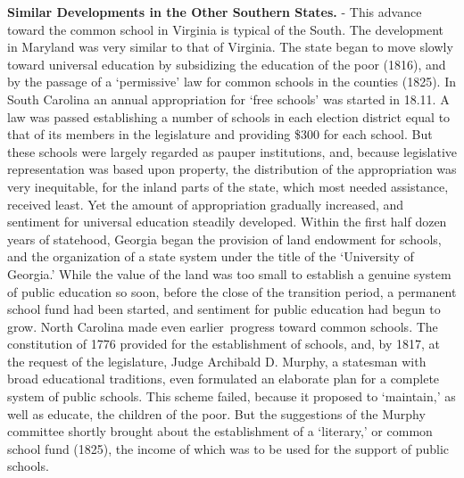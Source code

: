 \documentclass[
]{book}
\begin{document}
\textbf{Similar Developments in the Other Southern States.} - This advance toward the common school in Virginia is typical of the South. The development in Maryland was very similar to that of Virginia. The state began to move slowly toward universal education by subsidizing the education of the poor (1816), and by the passage of a `permissive' law for common schools in the counties (1825). In South Carolina an annual appropriation for `free schools' was started in 18.11. A law was passed establishing a number of schools in each election district equal to that of its members in the legislature and providing \$300 for each school. But these schools were largely regarded as pauper institutions, and, because legislative representation was based upon property, the distribution of the appropriation was very inequitable, for the inland parts of the state, which most needed assistance, received least. Yet the amount of appropriation gradually increased, and sentiment for universal education steadily developed. Within the first half dozen years of statehood, Georgia began the provision of land endowment for schools, and the organization of a state system under the title of the `University of Georgia.' While the value of the land was too small to establish a genuine system of public education so soon, before the close of the transition period, a permanent school fund had been started, and sentiment for public education had begun to grow. North Carolina made even earlier~progress toward common schools. The constitution of 1776 provided for the establishment of schools, and, by 1817, at the request of the legislature, Judge Archibald D. Murphy, a statesman with broad educational traditions, even formulated an elaborate plan for a complete system of public schools. This scheme failed, because it proposed to `maintain,' as well as educate, the children of the poor. But the suggestions of the Murphy committee shortly brought about the establishment of a `literary,' or common school fund (1825), the income of which was to be used for the support of public schools.
\end{document}
